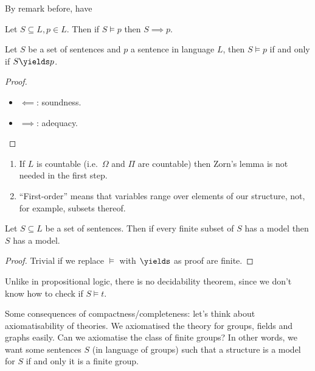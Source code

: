 \documentclass[a4paper]{article}
\begin{document}
By remark before, have

\begin{corollary}[Adequacy]
  Let \(S \subseteq L, p \in L\). Then if \(S \models p\) then \(S \implies p\).
\end{corollary}

\begin{theorem}
  \label{thm:Gödel completeness theorem}
  Let \(S\) be a set of sentences and \(p\) a sentence in language \(L\), then \(S \models p\) if and only if \(S \yields p\).
\end{theorem}

\begin{proof}\leavevmode
  \begin{itemize}
  \item \(\impliedby\): soundness.
  \item \(\implies\): adequacy.
  \end{itemize}
\end{proof}

\begin{remark}\leavevmode
  \begin{enumerate}
  \item If \(L\) is countable (i.e.\ \(\Omega\) and \(\Pi\) are countable) then Zorn's lemma is not needed in the first step.
  \item ``First-order'' means that variables range over elements of our structure, not, for example, subsets thereof.
  \end{enumerate}
\end{remark}

\begin{theorem}[Compactness]
  Let \(S \subseteq L\) be a set of sentences. Then if every finite subset of \(S\) has a model then \(S\) has a model.
\end{theorem}

\begin{proof}
  Trivial if we replace \(\models\) with \(\yields\) as proof are finite.
\end{proof}

\begin{note}
  Unlike in propositional logic, there is no decidability theorem, since we don't know how to check if \(S \models t\).
\end{note}

Some consequences of compactness/completeness: let's think about axiomatisability of theories. We axiomatised the theory for groups, fields and graphs easily. Can we axiomatise the class of finite groups? In other words, we want some sentences \(S\) (in language of groups) such that a structure is a model for \(S\) if and only it is a finite group.
\end{document}
